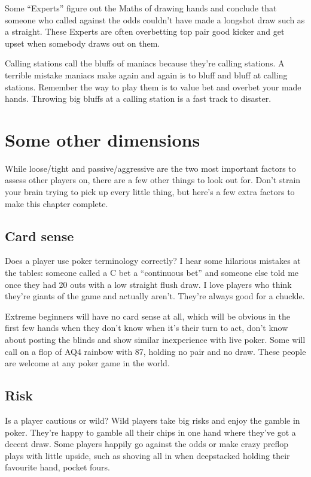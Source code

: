 Some ``Experts'' figure out the Maths of drawing hands and conclude
that someone who called against the odds couldn't have made a longshot
draw such as a straight. These Experts are often overbetting top pair
good kicker and get upset when somebody draws out on them.

Calling stations call the bluffs of maniacs because they're calling
stations. A terrible mistake maniacs make again and again is to bluff
and bluff at calling stations. Remember the way to play them is to
value bet and overbet your made hands. Throwing big bluffs at a
calling station is a fast track to disaster.

\section{Some other dimensions}

While loose/tight and passive/aggressive are the two most important
factors to assess other players on, there are a few other things to
look out for. Don't strain your brain trying to pick up every little
thing, but here's a few extra factors to make this chapter complete.

\subsection{Card sense}

Does a player use poker terminology correctly? I hear some hilarious
mistakes at the tables: someone called a C bet a ``continuous bet''
and someone else told me once they had 20 outs with a low straight
flush draw. I love players who think they're giants of the game
and actually aren't. They're always good for a chuckle.

Extreme beginners will have no card sense at all, which will be
obvious in the first few hands when they don't know when it's
their turn to act, don't know about posting the blinds and show
similar inexperience with live poker. Some will call on a flop
of AQ4 rainbow with 87, holding no pair and no draw. These people
are welcome at any poker game in the world.

\subsection{Risk}

Is a player cautious or wild? Wild players take big risks and
enjoy the gamble in poker. They're happy to gamble all their chips
in one hand where they've got a decent draw. Some players happily
go against the odds or make crazy preflop plays with little upside,
such as shoving all in when deepstacked holding their favourite
hand, pocket fours.

